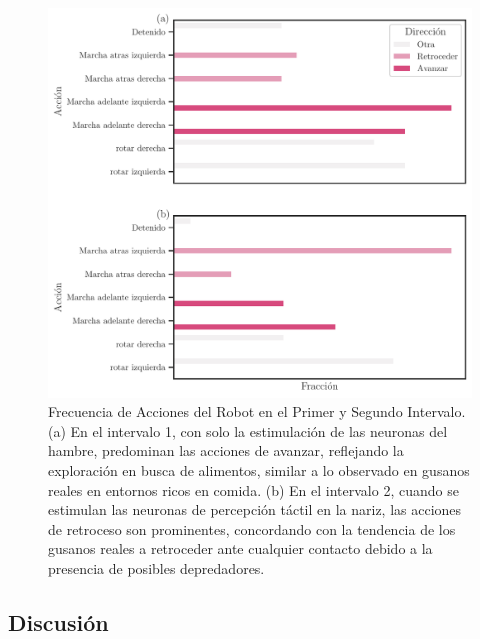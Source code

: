 \begin{figure}[h!]
	\centering\includegraphics[width=\imsize]{fraccion_acciones.pdf}
	\caption[  Frecuencia de Acciones del Robot en el Primer y Segundo Intervalo.]{ Frecuencia de Acciones del Robot en el Primer y Segundo Intervalo.  (a) En el intervalo 1, con solo la estimulación de las neuronas del hambre, predominan las acciones de avanzar, reflejando la exploración en busca de alimentos, similar a lo observado en gusanos reales en entornos ricos en comida. (b) En el intervalo 2, cuando se estimulan las neuronas de percepción táctil en la nariz, las acciones de retroceso son prominentes, concordando con la tendencia de los gusanos reales a retroceder ante cualquier contacto debido a la presencia de posibles depredadores.}\label{fig:intervalo_comportamiento}
\end{figure}




\subsection{Discusión}

